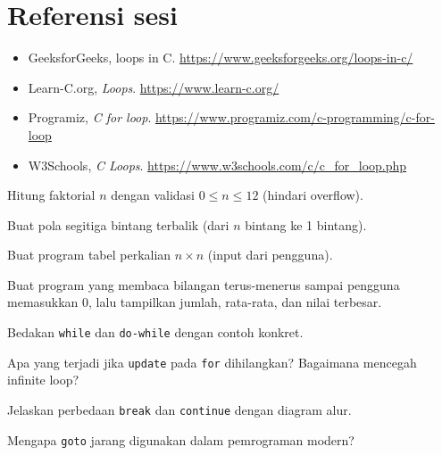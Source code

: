 \documentclass[../main.tex]{subfiles}
\begin{document}




\section{Referensi sesi}
\begin{itemize}[leftmargin=*]
  \item GeeksforGeeks, loops in C. \url{https://www.geeksforgeeks.org/loops-in-c/}
  \item Learn-C.org, \textit{Loops}. \url{https://www.learn-c.org/}
  \item Programiz, \textit{C for loop}. \url{https://www.programiz.com/c-programming/c-for-loop}
  \item W3Schools, \textit{C Loops}. \url{https://www.w3schools.com/c/c_for_loop.php}
\end{itemize}

\begin{aktivitas}
  \item Hitung faktorial $n$ dengan validasi $0 \leq n \leq 12$ (hindari overflow).
  \item Buat pola segitiga bintang terbalik (dari $n$ bintang ke 1 bintang).
  \item Buat program tabel perkalian $n \times n$ (input dari pengguna).
  \item Buat program yang membaca bilangan terus-menerus sampai pengguna memasukkan 0, lalu tampilkan jumlah, rata-rata, dan nilai terbesar.
\end{aktivitas}

\begin{latihan}
  \item Bedakan \texttt{while} dan \texttt{do-while} dengan contoh konkret.
  \item Apa yang terjadi jika \texttt{update} pada \texttt{for} dihilangkan? Bagaimana mencegah infinite loop?
  \item Jelaskan perbedaan \texttt{break} dan \texttt{continue} dengan diagram alur.
  \item Mengapa \texttt{goto} jarang digunakan dalam pemrograman modern?
\end{latihan}
\end{document}

